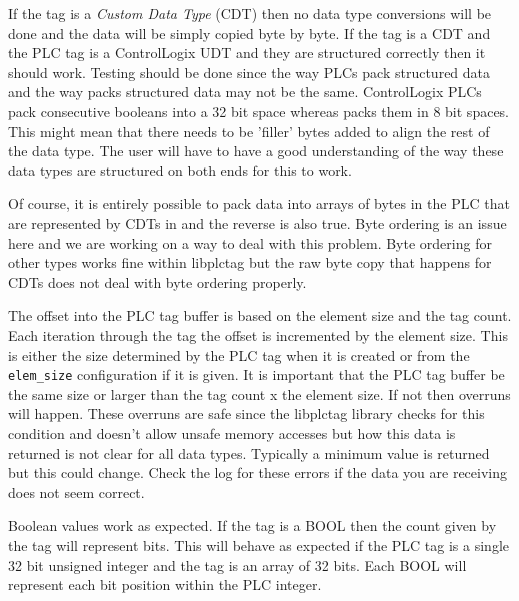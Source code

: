 If the \opendax{} tag is a \textit{Custom Data Type} (CDT) then no data type
conversions will be done and the data will be simply copied byte by byte.  If
the \opendax{} tag is a CDT and the PLC tag is a ControlLogix UDT and they
are structured correctly then it should work.  Testing should be done since
the way PLCs pack structured data and the way \opendax{} packs structured
data may not be the same.  ControlLogix PLCs pack consecutive booleans into
a 32 bit space whereas \opendax{} packs them in 8 bit spaces.  This might mean
that there needs to be 'filler' bytes added to align the rest of the data
type.  The user will have to have a good understanding of the way these
data types are structured on both ends for this to work.

Of course, it is entirely possible to pack data into arrays of bytes in
the PLC that are represented by CDTs in \opendax{} and the reverse is
also true.  Byte ordering is an issue here and we are working on a way
to deal with this problem.  Byte ordering for other types works fine
within libplctag but the raw byte copy that happens for CDTs does not
deal with byte ordering properly.

The offset into the PLC tag buffer is based on the element size and the 
\opendax{} tag count.  Each iteration through the \opendax{} tag
the offset is incremented by the element size.  This is either the size determined
by the PLC tag when it is created or from the \texttt{elem\_size} configuration
if it is given.  It is important that the PLC tag buffer be the same size
or larger than the \opendax{} tag count x the element size.  If not then
overruns will happen.  These overruns are safe since the libplctag library
checks for this condition and doesn't allow unsafe memory accesses but
how this data is returned is not clear for all data types.  Typically
a minimum value is returned but this could change.  Check the \opendax{}
log for these errors if the data you are receiving does not seem correct.

Boolean values work as expected.  If the \opendax{} tag is a BOOL then
the count given by the tag will represent bits.  This will behave as expected
if the PLC tag is a single 32 bit unsigned integer and the \opendax{} tag is
an array of 32 bits.  Each \opendax{} BOOL will represent each bit position
within the PLC integer.